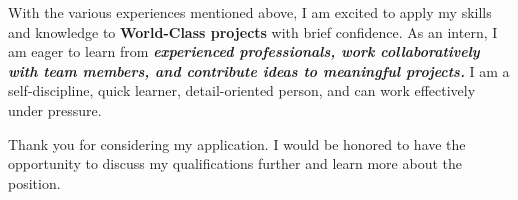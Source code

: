 With the various experiences mentioned above, I am excited to apply my skills and knowledge to \textbf{World-Class projects} with brief confidence. As an intern, I am eager to learn from \textbf{\emph{experienced professionals, work collaboratively with team members, and contribute ideas to meaningful projects.}} I am a self-discipline, quick learner, detail-oriented person, and can work effectively under pressure.

Thank you for considering my application. I would be honored to have the opportunity to discuss my qualifications further and learn more about the position.

